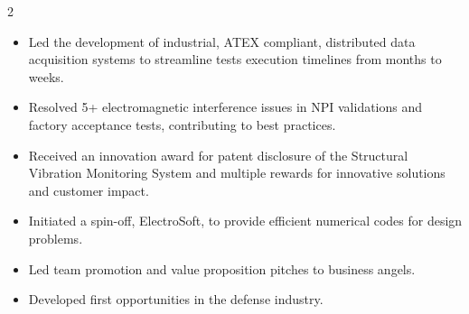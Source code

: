 \documentclass[9pt,a4paper,ragged2e,withhyper]{altacv} %
\begin{document}
\begin{paracol}{2}
\begin{itemize}
\item Led the development of industrial, ATEX compliant, distributed data acquisition systems to streamline tests execution timelines from months to weeks.
\item Resolved 5+ electromagnetic interference issues in NPI validations and factory acceptance tests, contributing to best practices.
\item Received an innovation award for patent disclosure of the Structural Vibration Monitoring System and multiple rewards for innovative solutions and customer impact.
\end{itemize}
\divider

\begin{itemize}
\item Initiated a spin-off, ElectroSoft, to provide efficient numerical codes for design problems.
\item Led team promotion and value proposition pitches to business angels.
\item Developed first opportunities in the defense industry.
\end{itemize}
\divider


\end{paracol}
\end{document}
